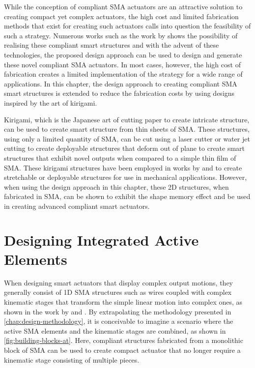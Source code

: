 While the conception of compliant SMA actuators are an attractive solution to creating compact yet complex actuators, the high cost and limited fabrication methods that exist for creating such actuators calls into question the feasibility of such a strategy. Numerous works such as the work by \todocite shows the possibility of realising these compliant smart structures and with the advent of these technologies, the proposed design approach can be used to design and generate these novel compliant SMA actuators. In most cases, however, the high cost of fabrication creates a limited implementation of the strategy for a wide range of applications. In this chapter, the design approach to creating compliant SMA smart structures is extended to reduce the fabrication costs by using designs inspired by the art of kirigami.

Kirigami, which is the Japanese art of cutting paper to create intricate structure, can be used to create smart structure from thin sheets of SMA. These structures, using only a limited quantity of SMA, can be cut using a laser cutter or water jet cutting to create deployable structures that deform out of plane to create smart structures that exhibit novel outputs when compared to a simple thin film of SMA. These kirigami structures have been employed in works by \todocite and \todocite to create stretchable or deployable structures for use in mechanical applications. However, when using the design approach in this chapter, these 2D structures, when fabricated in SMA, can be shown to exhibit the shape memory effect and be used in creating advanced compliant smart actuators.

\section{Designing Integrated Active Elements}
When designing smart actuators that display complex output motions, they generally consist of 1D SMA structures such as wires coupled with complex kinematic stages that transform the simple linear motion into complex ones, as shown in the work by \todocite and \todocite. By extrapolating the methodology presented in \cref{chap:design-methodology}, it is conceivable to imagine a scenario where the active SMA elements and the kinematic stages are combined, as shown in \cref{fig:building-blocks-at}. Here, compliant structures fabricated from a monolithic block of SMA can be used to create compact actuator that no longer require a kinematic stage consisting of multiple pieces.

